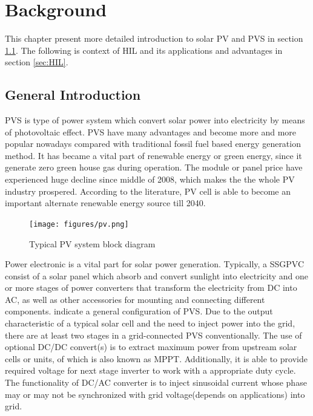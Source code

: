 \chapter{Background}\label{ch:background}
This chapter present more detailed introduction to solar \gls{PV} and \gls{PVS} in section \ref{sec:general_intro}. The following is context of \gls{HIL} and its applications and advantages in section \ref{sec:HIL}. 
\section{General Introduction}\label{sec:general_intro}
\gls{PVS} is type of power system which convert solar power into electricity by means of photovoltaic effect. \gls{PVS} have many advantages and become more and more popular nowadays compared with traditional fossil fuel based energy generation method. It has became a vital part of renewable energy or green energy, since it generate zero green house gas during operation. The module or panel price have experienced huge decline since middle of 2008\cite{Bazilian2013329}, which makes the the whole \gls{PV} industry prospered. According to the literature, \gls{PV} cell is able to become an important alternate renewable energy source till 2040\cite{RN3}. 
\begin{figure}[b]
    \centering
    \texttt{[image: figures/pv.png]}
    \caption{Typical PV system block diagram}
    \label{fig:typical pv system}
\end{figure}

Power electronic is a vital part for solar power generation. Typically, a \gls{SSGPVC} consist of a solar panel which absorb and convert sunlight into electricity and one or more stages of power converters that transform the electricity from \gls{DC} into \gls{AC}, as well as other accessories for mounting and connecting different components.  indicate a general configuration of \gls{PVS}. Due to the output characteristic of a typical solar cell and the need to inject power into the grid, there are at least two stages in a grid-connected PVS conventionally. The use of optional DC/DC convert(s) is to extract maximum power from upstream solar cells or units, of which is also known as \gls{MPPT}. Additionally, it is able to provide required voltage for next stage inverter to work with a appropriate duty cycle. The functionality of DC/AC converter is to inject sinusoidal current whose phase may or may not be synchronized with grid voltage(depends on applications) into grid. 

